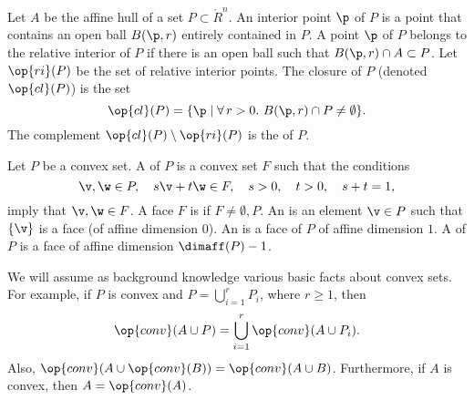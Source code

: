 \begin{definition}
Let
$A$ be the affine hull of a set $P\subset\ring{R}^n$.  An interior
point $\p$ of $P$ is a point that contains an open ball $B(\p,r)$
entirely contained in $P$.  A point $\p$ of $P$ belongs to the
relative interior of $P$ if there is an open ball such that $B(\p,r)
\cap A\subset P$.  Let $\op{ri}(P)$ be the set of relative interior
points.  The closure of $P$ (denoted $\op{cl}(P)$) is the set
\begin{displaymath}
\op{cl}(P) = \{\p \mid \forall\,r >0.~ B(\p,r) \cap P \ne \emptyset\}.
\end{displaymath}
The complement $\op{cl}(P)\setminus \op{ri}(P)$ is the
 of $P$.
\end{definition}
%
%
%
%
%
%
%

\begin{definition}
Let $P$ be a convex set.  A  of $P$ is a convex set
$F$ such that the conditions
\begin{displaymath}
\v,\w\in P,\quad s \v + t \w \in F,\quad s>0,\quad t>0,\quad s+t = 1,
\end{displaymath} 
imply that $\v,\w\in F$.  A face $F$ is  if $F\ne
\emptyset,P$.  An  is an element $\v\in P$ such that
$\{\v\}$ is a face (of affine dimension $0$).  An   is a face of $P$ of
affine dimension $1$.  A  of $P$ is a 
face of affine dimension $\dimaff(P)-1$.  %
\end{definition}

\begin{remark}\label{rem:convex-background}
We will assume as background knowledge various basic facts about convex sets.
For example,
if $P$ is convex and $P = \bigcup_{i=1}^r P_i$, where $r\ge 1$, then
\begin{displaymath}
\op{conv}(A\cup P ) = \bigcup_{i=1}^r\op{conv}(A\cup P_i).
\end{displaymath}
Also, $\op{conv}(A\cup \op{conv}(B)) = \op{conv}(A \cup B)$.
Furthermore, if $A$ is convex, then $A = \op{conv}(A)$.
\end{remark}


